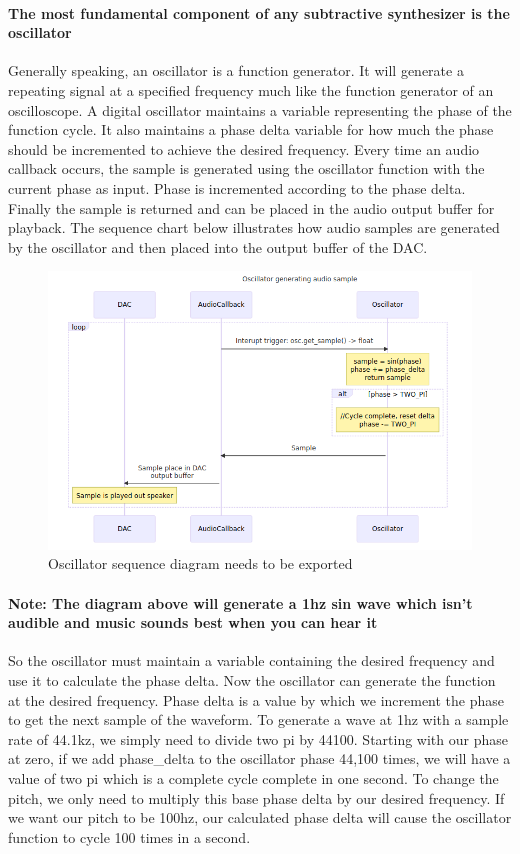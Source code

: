\documentclass[acmlarge,screen]{acmart}
\begin{document}
	\paragraph{The most fundamental component of any subtractive synthesizer is the oscillator} Generally speaking, an oscillator is a function generator. It will generate a repeating signal at a specified frequency much like the function generator of an oscilloscope. A digital oscillator maintains a variable representing the phase of the function cycle. It also maintains a phase delta variable for how much the phase should be incremented to achieve the desired frequency. Every time an audio callback occurs, the sample is generated using the oscillator function with the current phase as input. Phase is incremented according to the phase delta. Finally the sample is returned and can be placed in the audio output buffer for playback. The sequence chart below illustrates how audio samples are generated by the oscillator and then placed into the output buffer of the DAC.\cite{farnell_2010}
	
	\begin{figure}
		\includegraphics[width=\linewidth]{oscillator_sequence_diagram}
		\caption{Oscillator sequence diagram needs to be exported}
		\centering
	\end{figure}

	\paragraph{Note: The diagram above will generate a 1hz sin wave which isn't audible and music sounds best when you can hear it} So the oscillator must maintain a variable containing the desired frequency and use it to calculate the phase delta. Now the oscillator can generate the function at the desired frequency. Phase delta is a value by which we increment the phase to get the next sample of the waveform. To generate a wave at 1hz with a sample rate of 44.1kz, we simply need to divide two pi by 44100. Starting with our phase at zero, if we add phase\_delta to the oscillator phase 44,100 times, we will have a value of two pi which is a complete cycle complete in one second. To change the pitch, we only need to multiply this base phase delta by our desired frequency. If we want our pitch to be 100hz, our calculated phase delta will cause the oscillator function to cycle 100 times in a second. 
	
\end{document}
